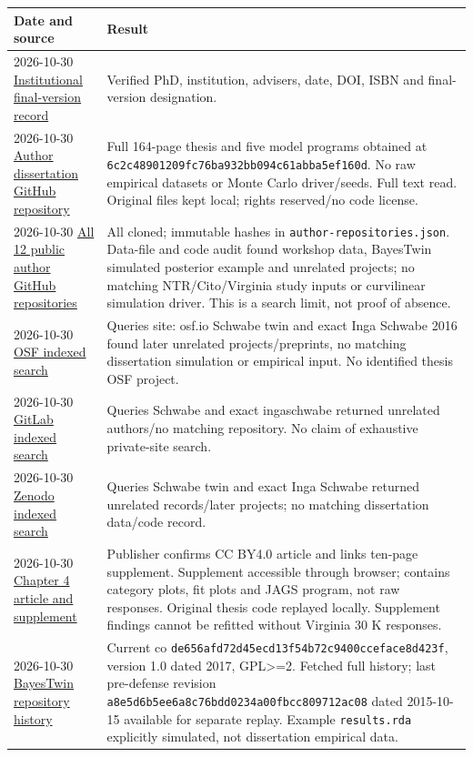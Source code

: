 \documentclass[11pt]{article}
\begin{document}
\begin{longtable}{p{75pt}p{370pt}}
\toprule Date and source & Result\\\midrule\endhead
2026-10-30 \href{https://research.utwente.nl/en/publications/nature-nurture-and-item-response-theory-a-psychometric-approach-t/}{Institutional final-version record} & Verified PhD, institution, advisers, date, DOI, ISBN and final-version designation.\\
2026-10-30 \href{https://github.com/ingaschwabe/Nature-Nurture-and-Item-Response-Theory}{Author dissertation GitHub repository} & Full 164-page thesis and five model programs obtained at \nolinkurl{6c2c48901209fc76ba932bb094c61abba5ef160d}. No raw empirical datasets or Monte Carlo driver/seeds. Full text read. Original files kept local; rights reserved/no code license.\\
2026-10-30 \href{https://github.com/ingaschwabe}{All 12 public author GitHub repositories} & All cloned; immutable hashes in \nolinkurl{author-repositories.json}. Data-file and code audit found workshop data, BayesTwin simulated posterior example and unrelated projects; no matching NTR/Cito/Virginia study inputs or curvilinear simulation driver. This is a search limit, not proof of absence.\\
2026-10-30 \href{https://osf.io/}{OSF indexed search} & Queries site: osf.io Schwabe twin and exact Inga Schwabe 2016 found later unrelated projects/preprints, no matching dissertation simulation or empirical input. No identified thesis OSF project.\\
2026-10-30 \href{https://gitlab.com/}{GitLab indexed search} & Queries Schwabe and exact ingaschwabe returned unrelated authors/no matching repository. No claim of exhaustive private-site search.\\
2026-10-30 \href{https://zenodo.org/}{Zenodo indexed search} & Queries Schwabe twin and exact Inga Schwabe returned unrelated records/later projects; no matching dissertation data/code record.\\
2026-10-30 \href{https://link.springer.com/article/10.1007/s10519-015-9768-9}{Chapter 4 article and supplement} & Publisher confirms CC BY4.0 article and links ten-page supplement. Supplement accessible through browser; contains category plots, fit plots and JAGS program, not raw responses. Original thesis code replayed locally. Supplement findings cannot be refitted without Virginia 30 K responses.\\
2026-10-30 \href{https://github.com/ingaschwabe/BayesTwin}{BayesTwin repository history} & Current co \nolinkurl{de656afd72d45ecd13f54b72c9400cceface8d423f}, version 1.0 dated 2017, GPL>=2. Fetched full history; last pre-defense revision \nolinkurl{a8e5d6b5ee6a8c76bdd0234a00fbcc809712ac08} dated 2015-10-15 available for separate replay. Example \nolinkurl{results.rda} explicitly simulated, not dissertation empirical data.\\

\end{longtable}
\end{document}
